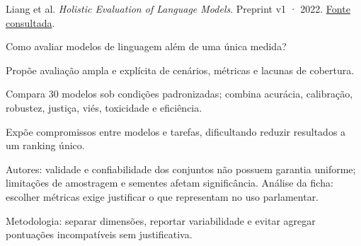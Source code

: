 {\small Liang et al. \textit{Holistic Evaluation of Language Models}. Preprint v1 · 2022. \href{https://arxiv.org/pdf/2211.09110v1}{Fonte consultada}.\par}

Como avaliar modelos de linguagem além de uma única medida?

Propõe avaliação ampla e explícita de cenários, métricas e lacunas de cobertura.

Compara 30 modelos sob condições padronizadas; combina acurácia, calibração, robustez, justiça, viés, toxicidade e eficiência.

Expõe compromissos entre modelos e tarefas, dificultando reduzir resultados a um ranking único.

\begin{itemize}
\end{itemize}

Autores: validade e confiabilidade dos conjuntos não possuem garantia uniforme; limitações de amostragem e sementes afetam significância. Análise da ficha: escolher métricas exige justificar o que representam no uso parlamentar.

Metodologia: separar dimensões, reportar variabilidade e evitar agregar pontuações incompatíveis sem justificativa.

